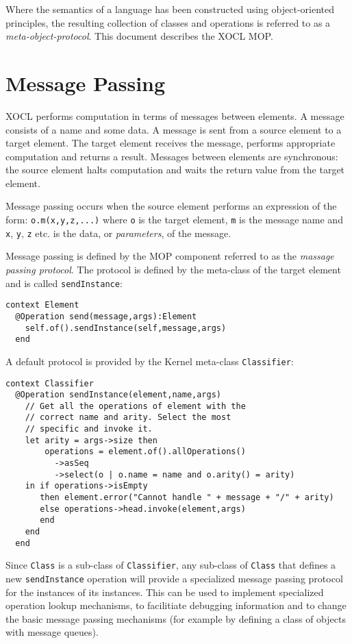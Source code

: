 \documentclass{article}
\begin{document}
Where the semantics of a language has been constructed using object-oriented principles, the
resulting collection of classes and operations is referred to as a {\em meta-object-protocol}.
This document describes the XOCL MOP.

\section{Message Passing}

XOCL performs computation in terms of messages between elements. A message consists of a name and
some data. A message is sent from a source element to a target element. The target element receives the
message, performs appropriate computation and returns a result. Messages between elements are
synchronous: the source element halts computation and waits the return value from the target
element.

Message passing occurs when the source element performs an expression of the form: {\tt o.m(x,y,z,...)}
where {\tt o} is the target element, {\tt m} is the message name and {\tt x}, {\tt y}, {\tt z} etc. is
the data, or {\em parameters}, of the message.

Message passing is defined by the MOP component referred to as the {\em massage passing protocol}.
The protocol is defined by the meta-class of the target element and is called {\tt sendInstance}:
\begin{verbatim}
context Element
  @Operation send(message,args):Element
    self.of().sendInstance(self,message,args)
  end
\end{verbatim}
A default protocol is provided by the Kernel meta-class {\tt Classifier}:
\begin{verbatim}
context Classifier
  @Operation sendInstance(element,name,args)
    // Get all the operations of element with the 
    // correct name and arity. Select the most 
    // specific and invoke it.
    let arity = args->size then
        operations = element.of().allOperations()
          ->asSeq
          ->select(o | o.name = name and o.arity() = arity)
    in if operations->isEmpty
       then element.error("Cannot handle " + message + "/" + arity)
       else operations->head.invoke(element,args)
       end
    end
  end
\end{verbatim}
Since {\tt Class} is a sub-class of {\tt Classifier}, any sub-class of {\tt Class} that defines a new
{\tt sendInstance} operation will provide a specialized message passing protocol for the instances
of its instances. This can be used to implement specialized operation lookup mechanisms, to 
facilitiate debugging information and to change the basic message passing mechanisms (for example
by defining a class of objects with message queues).
\end{document}
